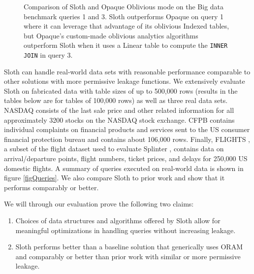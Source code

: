 \documentclass[USenglish,oneside,twocolumn]{article}
\def\name/{Sloth}
\begin{document}
\begin{figure}
\caption{Comparison of \name/ and Opaque Oblivious mode on the Big data benchmark queries 1 and 3. \name/ outperforms Opaque on query 1 where it can leverage that advantage of its oblivious Indexed tables, but Opaque's custom-made oblivious analytics algorithms outperform \name/ when it uses a Linear table to compute the \texttt{INNER JOIN} in query 3.} 
\label{figOpaque}
\end{figure}
\name/ can handle real-world data sets with reasonable performance comparable to other solutions with more permissive leakage functions. We extensively evaluate \name/ on fabricated data with table sizes of up to 500,000 rows (results in the tables below are for tables of 100,000 rows) as well as three real data sets. NASDAQ \cite{NASDAQ} consists of the last sale price and other related information for all approximately 3200 stocks on the NASDAQ stock exchange. CFPB \cite{CFPB} contains individual complaints on financial products and services sent to the US consumer financial protection bureau and contains about 106,000 rows. Finally, FLIGHTS \cite{FLIGHT}, a subset of the flight dataset used to evaluate Splinter \cite{WYG+17}, contains data on arrival/departure points, flight numbers, ticket prices, and delays for 250,000 US domestic flights. A summary of queries executed on real-world data is shown in figure \ref{figQueries}. We also compare \name/ to prior work and show that it performs comparably or better. 

We will through our evaluation prove the following two claims: 

\begin{enumerate}
\item Choices of data structures and algorithms offered by \name/ allow for meaningful optimizations in handling queries without increasing leakage. 

\item \name/ performs better than a baseline solution that generically uses ORAM and comparably or better than prior work with similar or more permissive leakage.
\end{enumerate}
\end{document}

